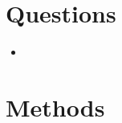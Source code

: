 \documentclass{report}
\theoremstyle{definition}
\begin{document}
\chapter{Questions}
\begin{itemize}{}
  \item
\end{itemize}
\chapter{Methods}
\end{document}
